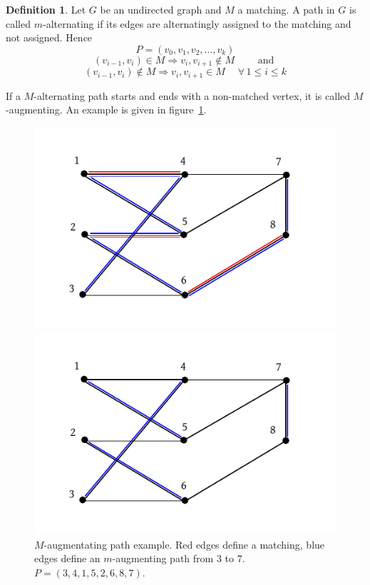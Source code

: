 \documentclass[a4paper]{article}
\theoremstyle{definition}
\newtheorem{definition}[theorem]{Definition}
\newcommand{\fall}{\;\forall\,}
\begin{document}
\begin{definition}
  Let $G$ be an undirected graph and $M$ a matching. A path in $G$ is called $m$-alternating if its edges are alternatingly assigned to the matching and not assigned. Hence
  \[ P = (v_0, v_1, v_2, \ldots, v_k) \]
  \[
    (v_{i-1}, v_i) \in M \Rightarrow v_i, v_{i+1} \notin M \qquad\text{ and }
  \] \[
    (v_{i-1}, v_i) \notin M \Rightarrow v_i, v_{i+1} \in M \quad
    \fall 1 \leq i \leq k
  \]

  If a $M$-alternating path starts and ends with a non-matched vertex, it is called $M$-augmenting.
  An example is given in figure~\ref{img:maugmenting}.
\end{definition}
%
\begin{figure}[p]
  \begin{center}
    \includegraphics{img/M-augmenting_path_example.pdf}
    \caption{
      $M$-augmentating path example.
      Red edges define a matching, blue edges define an $m$-augmenting path from $3$ to $7$.
      $P = (3, 4, 1, 5, 2, 6, 8, 7)$.
    }
    \label{img:maugmenting}
  \end{center}
  \begin{center}
    \includegraphics{img/Mprime_example.pdf}

\end{center}
\end{figure}
\end{document}
